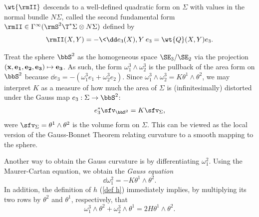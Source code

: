 \begin{defn}
    $\wt{\rmII}$ descends to a well-defined quadratic form on $\Sigma$ with values in the normal bundle $N\Sigma$, called the second fundamental form $\rmII\in\Gamma^\infty(\rmS^2\T^\ast\Sigma\otimes N\Sigma)$ defined by
    \[\rmII(X,Y)=-\<\dd e_3(X),Y\>e_3=\wt{Q}(X,Y)e_3.\]
\end{defn}

\begin{rem}
    Treat the sphere $\bbS^2$ as the homogeneous space $\SE_3\slash\SE_2$ via the projection $(\bf{x},e_1,e_2,e_3)\mapsto e_3$. As such, the form $\omega_1^3\wedge\omega_2^3$ is the pullback of the area form on $\bbS^2$ because $\dd e_3=-(\omega_1^3 e_1+\omega_2^3 e_2)$. Since $\omega_1^3\wedge\omega_2^3=K\theta^1\wedge\theta^2$, we may interpret $K$ as a measure of how much the area of $\Sigma$ is (infinitesimally) distorted under the Gauss map $e_3:\Sigma\to \bbS^2$:
    \[e_3^\ast \sfv_{\bbS^2}=K\sfv_{\Sigma},\]
    were $\sfv_\Sigma=\theta^1\wedge\theta^2$ is the volume form on $\Sigma$. This can be viewed as the local version of the Gauss-Bonnet Theorem relating curvature to a smooth mapping to the sphere.
\end{rem}

Another way to obtain the Gauss curvature is by differentiating $\omega_1^2$. Using the Maurer-Cartan equation, we obtain the \emph{Gauss equation}
\[\dd\omega_1^2=-K\theta^1\wedge\theta^2.\label{eq 2.14 Ivey}\]
In addition, the definition of $h$ (\ref{def h}) immediately implies, by multiplying its two rows by $\theta^2$ and $\theta^1$, respectively, that
\[\omega_1^3\wedge\theta^2+\omega_2^3\wedge\theta^1=2H\theta^1\wedge\theta^2.\]

